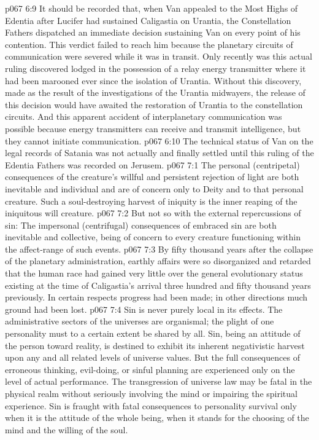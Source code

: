\pc \vs p067 6:9 It should be recorded that, when Van appealed to the Most Highs of Edentia after Lucifer had sustained Caligastia on Urantia, the Constellation Fathers dispatched an immediate decision sustaining Van on every point of his contention. This verdict failed to reach him because the planetary circuits of communication were severed while it was in transit. Only recently was this actual ruling discovered lodged in the possession of a relay energy transmitter where it had been marooned ever since the isolation of Urantia. Without this discovery, made as the result of the investigations of the Urantia midwayers, the release of this decision would have awaited the restoration of Urantia to the constellation circuits. And this apparent accident of interplanetary communication was possible because energy transmitters can receive and transmit intelligence, but they cannot initiate communication.
\vs p067 6:10 The technical status of Van on the legal records of Satania was not actually and finally settled until this ruling of the Edentia Fathers was recorded on Jerusem.\plusone
{}
\vs p067 7:1 The personal (centripetal) consequences of the creature’s willful and persistent rejection of light are both inevitable and individual and are of concern only to Deity and to that personal creature. Such a soul\hyp{}destroying harvest of iniquity is the inner reaping of the iniquitous will creature.
\vs p067 7:2 But not so with the external repercussions of sin: The impersonal (centrifugal) consequences of embraced sin are both inevitable and collective, being of concern to every creature functioning within the affect\hyp{}range of such events.
\vs p067 7:3 By fifty thousand years after the collapse of the planetary administration, earthly affairs were so disorganized and retarded that the human race had gained very little over the general evolutionary status existing at the time of Caligastia’s arrival three hundred and fifty thousand years previously. In certain respects progress had been made; in other directions much ground had been lost.
\vs p067 7:4 Sin is never purely local in its effects. The administrative sectors of the universes are organismal; the plight of one personality must to a certain extent be shared by all. Sin, being an attitude of the person toward reality, is destined to exhibit its inherent negativistic harvest upon any and all related levels of universe values. But the full consequences of erroneous thinking, evil\hyp{}doing, or sinful planning are experienced only on the level of actual performance. The transgression of universe law may be fatal in the physical realm without seriously involving the mind or impairing the spiritual experience. Sin is fraught with fatal consequences to personality survival only when it is the attitude of the whole being, when it stands for the choosing of the mind and the willing of the soul.
